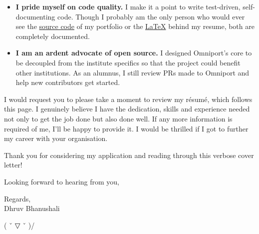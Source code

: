 \begin{itemize}[nosep, parsep=1mm, leftmargin=*]
  \item \textbf{I pride myself on code quality.} I make it a point to write
  test-driven, self-documenting code. Though I probably am the only person who
  would ever see the \href{https://github.com/dhruvkb/portfolio/}{source code}
  of my portfolio or the
  \href{https://github.com/dhruvkb/resume/}{\selectfont\LaTeX}
  behind my resume, both are completely documented.

  \item \textbf{I am an ardent advocate of open source.} I designed Omniport's
  core to be decoupled from the institute specifics so that the project could
  benefit other institutions. As an alumnus, I still review PRs made to Omniport
  and help new contributors get started.
\end{itemize}

I would request you to please take a moment to review my résumé, which follows
this page. I genuinely believe I have the dedication, skills and experience
needed not only to get the job done but also done well. If any more information
is required of me, I'll be happy to provide it. I would be thrilled if I got to
further my career with your organisation.

Thank you for considering my application and reading through this verbose cover
letter!

Looking forward to hearing from you,

Regards,\\
Dhruv Bhanushali
\setlength{\parskip}{0cm} %

\vfill
\textcolor{secondary}{( ˇ ▽ ˇ )/}
\pagebreak